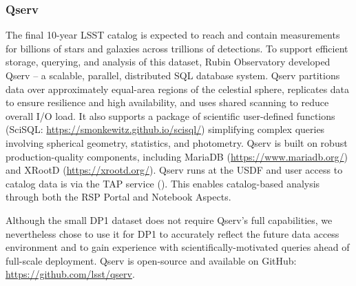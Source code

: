 \subsubsection{Qserv}
\label{sssec:qserv}
The final 10-year \gls{LSST} catalog is expected to reach \tenyearcatalogsize and contain measurements for billions of stars and galaxies across trillions of detections.
To support efficient storage, querying, and analysis of this dataset,  Rubin Observatory developed Qserv \citep{Wang:2011:QDS:2063348.2063364, C15_adassxxxii} -- a scalable, parallel, distributed SQL database system.
\gls{Qserv} partitions data over approximately equal-area regions of the celestial sphere, replicates data to ensure resilience and high availability, and uses shared scanning to reduce overall I/O load.
It also supports a package of scientific user-defined functions (SciSQL: \url{https://smonkewitz.github.io/scisql/}) simplifying complex queries involving spherical geometry, statistics, and photometry.
\gls{Qserv} is built on robust production-quality components, including MariaDB (\url{https://www.mariadb.org/}) and XRootD (\url{https://xrootd.org/}).
Qserv runs at the \gls{USDF} and user access to catalog data is via the TAP service ().
This enables catalog-based analysis through both the \gls{RSP} Portal and Notebook Aspects.

Although the small \gls{DP1} dataset does not require Qserv’s full capabilities, we nevertheless chose to use it for \gls{DP1} to accurately reflect the future data access environment and to gain experience with scientifically-motivated queries ahead of full-scale deployment.
\gls{Qserv} is open-source and available on GitHub: \url{https://github.com/lsst/qserv}.

